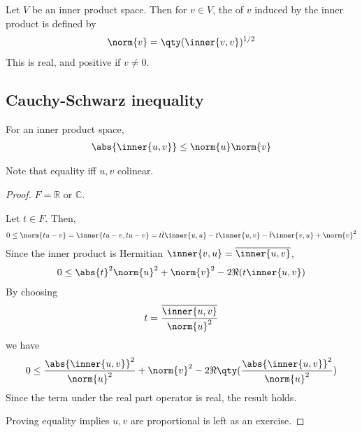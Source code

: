 \begin{definition}[Norm]
	Let $V$ be an inner product space.
	Then for $v \in V$, the  of $v$ induced by the inner product is defined by
	\begin{align*}
		\norm{v} = \qty(\inner{v,v})^{1/2}
	\end{align*}
	This is real, and positive if $v \neq 0$.
\end{definition}

\subsection{Cauchy-Schwarz inequality}
\begin{lemma}
	For an inner product space,
	\begin{align*}
		\abs{\inner{u,v}} \leq \norm{u} \norm{v}
	\end{align*}
\end{lemma}

\begin{remark}
	Note that equality iff $u, v$ colinear.
\end{remark} 

\begin{proof}
	$F = \mathbb{R}$ or $\mathbb{C}$.

	Let $t \in F$.
	Then,
	\begin{align*}
		0 \leq \norm{t u - v} = \inner{tu - v, tu - v} = t \overline t \inner{u,u} - t \inner{u,v} - \overline t \inner{v,u} + \norm{v}^2
	\end{align*}
	Since the inner product is Hermitian $\inner{v, u} = \overline{\inner{u, v}}$,
	\begin{align*}
		0 \leq \abs{t}^2 \norm{u}^2 + \norm{v}^2 - 2 \Re(t \inner{u,v})
	\end{align*}
	By choosing
	\begin{align*}
		t = \frac{\overline{\inner{u,v}}}{\norm{u}^2}
	\end{align*}
	we have
	\begin{align*}
		0 \leq \frac{\abs{\inner{u,v}}^2}{\norm{u}^2} + \norm{v}^2 - 2 \Re\qty(\frac{\abs{\inner{u,v}}^2}{\norm{u}^2})
	\end{align*}
	Since the term under the real part operator is real, the result holds.

	Proving equality implies $u, v$ are proportional is left as an exercise.
\end{proof}


